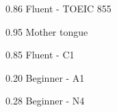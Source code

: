 
    {0.86}
    {Fluent - TOEIC 855}
    {}{}{}

    {0.95}
    {Mother tongue}
    {}{}{}

    {0.85}
    {Fluent - C1}
    {}{}{}

    {0.20}
    {Beginner - A1}
    {}{}{}

    {0.28}
    {Beginner - N4}
    {}{}{}
